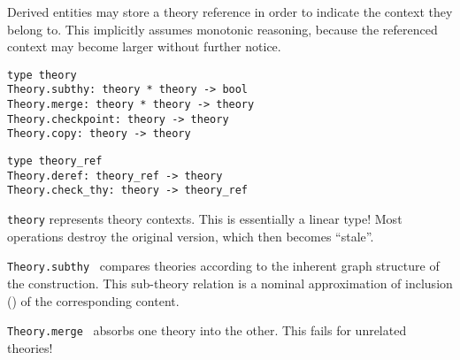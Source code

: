 \begin{isabellebody}
\begin{isamarkuptext}
  Derived entities may store a theory reference in order to indicate
  the context they belong to.  This implicitly assumes monotonic
  reasoning, because the referenced context may become larger without
  further notice.%
\end{isamarkuptext}%
\isamarkuptrue%
%
\isadelimmlref
%
\endisadelimmlref
%
\isatagmlref
%
\begin{isamarkuptext}%
\begin{mldecls}
  \verb|type theory| \\
  \verb|Theory.subthy: theory * theory -> bool| \\
  \verb|Theory.merge: theory * theory -> theory| \\
  \verb|Theory.checkpoint: theory -> theory| \\
  \verb|Theory.copy: theory -> theory| \\
  \end{mldecls}
  \begin{mldecls}
  \verb|type theory_ref| \\
  \verb|Theory.deref: theory_ref -> theory| \\
  \verb|Theory.check_thy: theory -> theory_ref| \\
  \end{mldecls}

  \begin{description}

  \item \verb|theory| represents theory contexts.  This is
  essentially a linear type!  Most operations destroy the original
  version, which then becomes ``stale''.

  \item \verb|Theory.subthy|~
  compares theories according to the inherent graph structure of the
  construction.  This sub-theory relation is a nominal approximation
  of inclusion (\isa{{\isasymsubseteq}}) of the corresponding content.

  \item \verb|Theory.merge|~
  absorbs one theory into the other.  This fails for unrelated
  theories!


\end{description}
\end{isamarkuptext}
\end{isabellebody}

